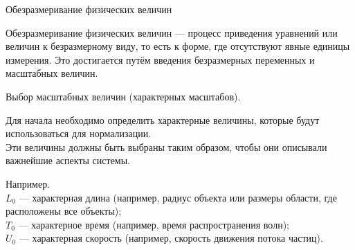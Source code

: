 \documentclass{beamer}
\begin{document}
	\begin{frame}{Обезразмеривание физических величин}
	
		Обезразмеривание физических величин --- процесс приведения уравнений или величин к безразмерному виду, то есть к форме, где отсутствуют явные единицы измерения. 
		Это достигается путём введения безразмерных переменных и масштабных величин. 

		\vspace{0.15cm}
		Выбор масштабных величин (характерных масштабов).

		Для начала необходимо определить характерные величины, которые будут использоваться для нормализации.\\
		Эти величины должны быть выбраны таким образом, чтобы они описывали важнейшие аспекты системы.
		
		\footnotesize
		Например.\\

    $L_0$ --- характерная длина (например, радиус объекта или размеры области, где расположены все объекты);\\
    $T_0$ --- характерное время (например, время распространения волн);\\
    $U_0$ --- характерная скорость (например, скорость движения потока частиц).



	
	\end{frame}
\end{document}
